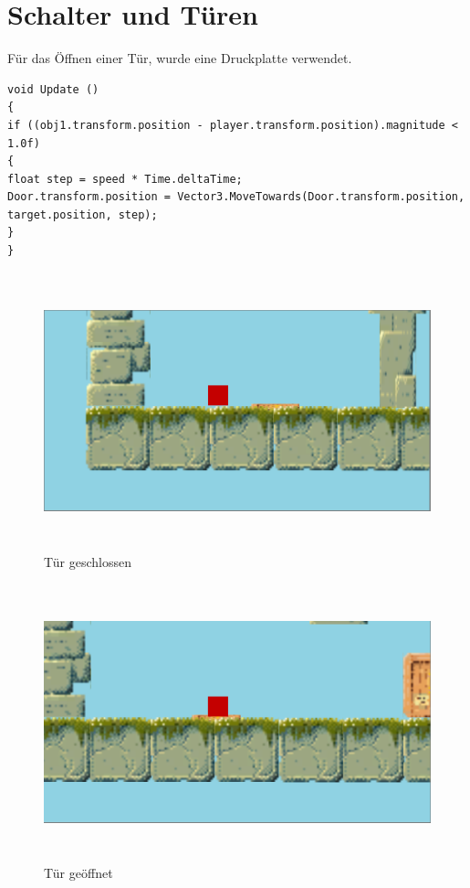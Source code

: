\section{Schalter und Türen}
Für das Öffnen einer Tür, wurde eine Druckplatte verwendet. 
\begin{lstlisting}[language={[Sharp]C}]
void Update ()
{
if ((obj1.transform.position - player.transform.position).magnitude < 1.0f)
{
float step = speed * Time.deltaTime;
Door.transform.position = Vector3.MoveTowards(Door.transform.position, target.position, step);
}
}
\end{lstlisting}

\begin{figure}[H]
	\includegraphics[height=8cm]{images/TuerZu.png}
	\caption{Tür geschlossen}
\end{figure}
\begin{figure}[H]
	\includegraphics[height=8cm]{images/TuerOffen.png}
	\caption{Tür geöffnet}
\end{figure}

